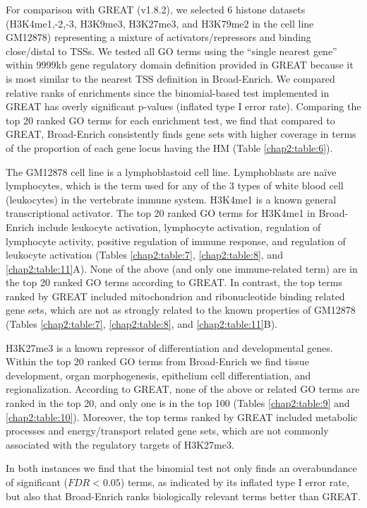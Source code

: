 For comparison with GREAT (v1.8.2), we selected 6 histone datasets (H3K4me1,-2,-3, H3K9me3, H3K27me3, and H3K79me2 in the cell line GM12878) representing a mixture of activators/repressors and binding close/distal to TSSs. We tested all GO terms using the “single nearest gene” within 9999kb gene regulatory domain definition provided in GREAT because it is most similar to the nearest TSS definition in Broad-Enrich. We compared relative ranks of enrichments since the binomial-based test implemented in GREAT has overly significant p-values (inflated type I error rate). Comparing the top 20 ranked GO terms for each enrichment test, we find that compared to GREAT, Broad-Enrich consistently finds gene sets with higher coverage in terms of the proportion of each gene locus having the HM (Table \ref{chap2:table:6}).

The GM12878 cell line is a lymphoblastoid cell line. Lymphoblasts are naïve lymphocytes, which is the term used for any of the 3 types of white blood cell (leukocytes) in the vertebrate immune system. H3K4me1 is a known general transcriptional activator. The top 20 ranked GO terms for H3K4me1 in Broad-Enrich include leukocyte activation, lymphocyte activation, regulation of lymphocyte activity, positive regulation of immune response, and regulation of leukocyte activation (Tables \ref{chap2:table:7}, \ref{chap2:table:8}, and \ref{chap2:table:11}A). None of the above (and only one immune-related term) are in the top 20 ranked GO terms according to GREAT. In contrast, the top terms ranked by GREAT included mitochondrion and ribonucleotide binding related gene sets, which are not as strongly related to the known properties of GM12878 (Tables \ref{chap2:table:7}, \ref{chap2:table:8}, and \ref{chap2:table:11}B).

H3K27me3 is a known repressor of differentiation and developmental genes. Within the top 20 ranked GO terms from Broad-Enrich we find tissue development, organ morphogenesis, epithelium cell differentiation, and regionalization. According to GREAT, none of the above or related GO terms are ranked in the top 20, and only one is in the top 100 (Tables \ref{chap2:table:9} and \ref{chap2:table:10}). Moreover, the top terms ranked by GREAT included metabolic processes and energy/transport related gene sets, which are not commonly associated with the regulatory targets of H3K27me3.

In both instances we find that the binomial test not only finds an overabundance of significant ($FDR < 0.05$) terms, as indicated by its inflated type I error rate, but also that Broad-Enrich ranks biologically relevant terms better than GREAT.

